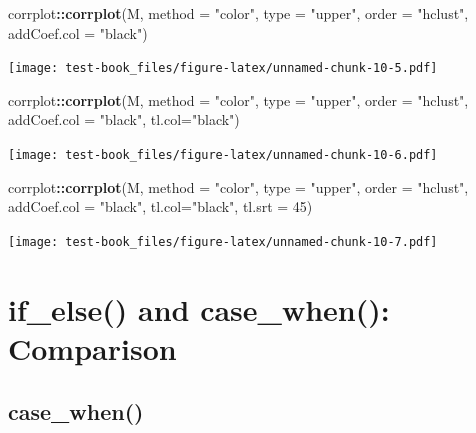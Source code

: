 \documentclass[]{book}
\newenvironment{Shaded}{\begin{snugshade}}{\end{snugshade}}
\newcommand{\DataTypeTok}[1]{\textcolor[rgb]{0.13,0.29,0.53}{#1}}
\newcommand{\DecValTok}[1]{\textcolor[rgb]{0.00,0.00,0.81}{#1}}
\newcommand{\KeywordTok}[1]{\textcolor[rgb]{0.13,0.29,0.53}{\textbf{#1}}}
\newcommand{\NormalTok}[1]{#1}
\newcommand{\OperatorTok}[1]{\textcolor[rgb]{0.81,0.36,0.00}{\textbf{#1}}}
\newcommand{\StringTok}[1]{\textcolor[rgb]{0.31,0.60,0.02}{#1}}
\begin{document}
\begin{Shaded}
\begin{Highlighting}[]
\NormalTok{corrplot}\OperatorTok{::}\KeywordTok{corrplot}\NormalTok{(M, }\DataTypeTok{method =} \StringTok{"color"}\NormalTok{, }\DataTypeTok{type =} \StringTok{"upper"}\NormalTok{, }\DataTypeTok{order =} \StringTok{"hclust"}\NormalTok{, }\DataTypeTok{addCoef.col =} \StringTok{"black"}\NormalTok{)}
\end{Highlighting}
\end{Shaded}

\texttt{[image: test-book\_files/figure-latex/unnamed-chunk-10-5.pdf]}

\begin{Shaded}
\begin{Highlighting}[]
\NormalTok{corrplot}\OperatorTok{::}\KeywordTok{corrplot}\NormalTok{(M, }\DataTypeTok{method =} \StringTok{"color"}\NormalTok{, }\DataTypeTok{type =} \StringTok{"upper"}\NormalTok{, }\DataTypeTok{order =} \StringTok{"hclust"}\NormalTok{, }\DataTypeTok{addCoef.col =} \StringTok{"black"}\NormalTok{, }\DataTypeTok{tl.col=}\StringTok{"black"}\NormalTok{)}
\end{Highlighting}
\end{Shaded}

\texttt{[image: test-book\_files/figure-latex/unnamed-chunk-10-6.pdf]}

\begin{Shaded}
\begin{Highlighting}[]
\NormalTok{corrplot}\OperatorTok{::}\KeywordTok{corrplot}\NormalTok{(M, }\DataTypeTok{method =} \StringTok{"color"}\NormalTok{, }\DataTypeTok{type =} \StringTok{"upper"}\NormalTok{, }\DataTypeTok{order =} \StringTok{"hclust"}\NormalTok{, }\DataTypeTok{addCoef.col =} \StringTok{"black"}\NormalTok{, }\DataTypeTok{tl.col=}\StringTok{"black"}\NormalTok{, }\DataTypeTok{tl.srt =} \DecValTok{45}\NormalTok{)}
\end{Highlighting}
\end{Shaded}

\texttt{[image: test-book\_files/figure-latex/unnamed-chunk-10-7.pdf]}

\hypertarget{ifelsecasewhen}{%
\chapter{if\_else() and case\_when(): Comparison}\label{ifelsecasewhen}}

\hypertarget{case_when}{%
\section{case\_when()}\label{case_when}}
\end{document}
